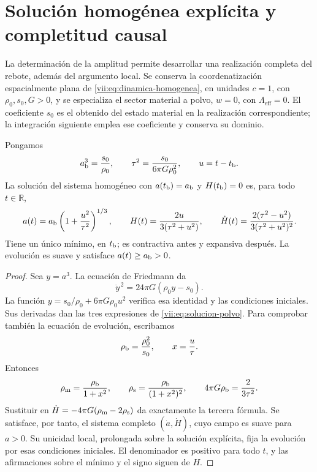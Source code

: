 \section{Solución homogénea explícita y completitud causal}
\label{vii:sec:solucion-homogenea}
La determinación de la amplitud permite desarrollar una realización
completa del rebote, además del argumento local. Se conserva la coordenatización
espacialmente plana de \eqref{vii:eq:dinamica-homogenea}, en unidades
\(c=1\), con \(\rho_0,s_0,G>0\), y se especializa el sector material
a polvo, \(w=0\), con \(\Lambda_{\mathrm{eff}}=0\).
El coeficiente \(s_0\) es el obtenido del estado
material en la realización correspondiente; la integración siguiente
emplea ese coeficiente y conserva su dominio.

\begin{theorem}
\label{vii:thm:rebote-polvo}
Pongamos
\[
 a_{\rm b}^3=\frac{s_0}{\rho_0},\qquad
 \tau^2=\frac{s_0}{6\pi G\rho_0^2},\qquad u=t-t_{\rm b}.
\]
La solución del sistema homogéneo con
\(a(t_{\rm b})=a_{\rm b}\) y \(H(t_{\rm b})=0\) es, para todo
\(t\in\mathbb R\),
\begin{equation}
 a(t)=a_{\rm b}\left(1+\frac{u^2}{\tau^2}\right)^{1/3},
 \qquad H(t)=\frac{2u}{3(\tau^2+u^2)},\qquad
 \dot H(t)=\frac{2(\tau^2-u^2)}{3(\tau^2+u^2)^2}.
 \label{vii:eq:solucion-polvo}
\end{equation}
Tiene un único mínimo, en \(t_{\rm b}\); es contractiva antes y
expansiva después. La evolución es suave y satisface
\(a(t)\geq a_{\rm b}>0\).
\end{theorem}
\begin{proof}
Sea \(y=a^3\). La ecuación de Friedmann da
\[
 \dot y^{\,2}=24\pi G(\rho_0y-s_0).
\]
La función \(y=s_0/\rho_0+6\pi G\rho_0u^2\) verifica esa
identidad y las condiciones iniciales. Sus derivadas dan las
tres expresiones de \eqref{vii:eq:solucion-polvo}. Para comprobar
también la ecuación de evolución, escribamos
\[
 \rho_{\rm b}=\frac{\rho_0^2}{s_0},\qquad
 x=\frac{u}{\tau}.
\]
Entonces
\[
 \rho_{\rm m}=\frac{\rho_{\rm b}}{1+x^2},\qquad
 \rho_{\rm s}=\frac{\rho_{\rm b}}{(1+x^2)^2},\qquad
 4\pi G\rho_{\rm b}=\frac{2}{3\tau^2}.
\]
Sustituir en \(\dot H=-4\pi G(\rho_{\rm m}-2\rho_{\rm s})\)
da exactamente la tercera fórmula. Se satisface, por tanto,
el sistema completo \((\dot a,\dot H)\), cuyo campo es suave
para \(a>0\). Su unicidad local, prolongada sobre la solución
explícita, fija la evolución por esas condiciones iniciales.
El denominador es positivo para todo \(t\), y las afirmaciones
sobre el mínimo y el signo siguen de \(H\).
\end{proof}

